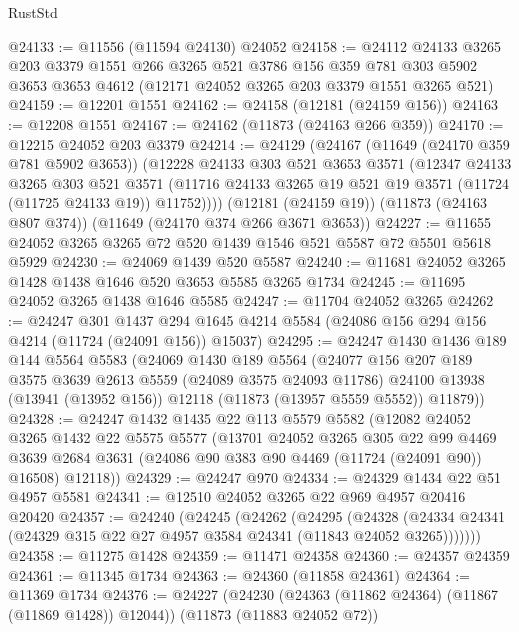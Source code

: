 \begin{lexlean}{RustStd}
\begin{coremodule}
@24133 := @11556 (@11594 @24130) @24052
@24158 := @24112
    @24133
    @3265
    @203
    @3379
    @1551
    @266
    @3265
    @521
    @3786
    @156
    @359
    @781
    @303
    @5902
    @3653
    @3653
    @4612
    (@12171 @24052 @3265 @203 @3379 @1551 @3265 @521)
@24159 := @12201 @1551
@24162 := @24158 (@12181 (@24159 @156))
@24163 := @12208 @1551
@24167 := @24162 (@11873 (@24163 @266 @359))
@24170 := @12215 @24052 @203 @3379
@24214 := @24129
    (@24167
      (@11649 (@24170 @359 @781 @5902 @3653))
      (@12228
        @24133
        @303
        @521
        @3653
        @3571
        (@12347
          @24133
          @3265
          @303
          @521
          @3571
          (@11716 @24133 @3265 @19 @521 @19 @3571 (@11724 (@11725 @24133 @19)) @11752))))
    (@12181 (@24159 @19))
    (@11873 (@24163 @807 @374))
    (@11649 (@24170 @374 @266 @3671 @3653))
@24227 := @11655 @24052 @3265 @3265 @72 @520 @1439 @1546 @521 @5587 @72 @5501 @5618 @5929
@24230 := @24069 @1439 @520 @5587
@24240 := @11681 @24052 @3265 @1428 @1438 @1646 @520 @3653 @5585 @3265 @1734
@24245 := @11695 @24052 @3265 @1438 @1646 @5585
@24247 := @11704 @24052 @3265
@24262 := @24247
    @301
    @1437
    @294
    @1645
    @4214
    @5584
    (@24086 @156 @294 @156 @4214 (@11724 (@24091 @156)) @15037)
@24295 := @24247
    @1430
    @1436
    @189
    @144
    @5564
    @5583
    (@24069
      @1430
      @189
      @5564
      (@24077
        @156
        @207
        @189
        @3575
        @3639
        @2613
        @5559
        (@24089 @3575 @24093 @11786)
        @24100
        @13938
        (@13941 (@13952 @156))
        @12118
        (@11873 (@13957 @5559 @5552))
        @11879))
@24328 := @24247
    @1432
    @1435
    @22
    @113
    @5579
    @5582
    (@12082
      @24052
      @3265
      @1432
      @22
      @5575
      @5577
      (@13701
        @24052
        @3265
        @305
        @22
        @99
        @4469
        @3639
        @2684
        @3631
        (@24086 @90 @383 @90 @4469 (@11724 (@24091 @90)) @16508)
        @12118))
@24329 := @24247 @970
@24334 := @24329 @1434 @22 @51 @4957 @5581
@24341 := @12510 @24052 @3265 @22 @969 @4957 @20416 @20420
@24357 := @24240
    (@24245
      (@24262
        (@24295
          (@24328 (@24334 @24341 (@24329 @315 @22 @27 @4957 @3584 @24341 (@11843 @24052 @3265)))))))
@24358 := @11275 @1428
@24359 := @11471 @24358
@24360 := @24357 @24359
@24361 := @11345 @1734
@24363 := @24360 (@11858 @24361)
@24364 := @11369 @1734
@24376 := @24227
    (@24230 (@24363 (@11862 @24364) (@11867 (@11869 @1428)) @12044))
    (@11873 (@11883 @24052 @72))

\end{coremodule}
\end{lexlean}
